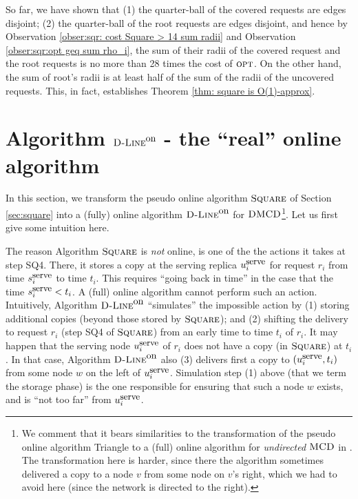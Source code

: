 \documentclass[11pt]{article}
\newcommand{\MCD}{\mbox{\sc MCD}}
\newcommand{\DMCD}{\mbox{\sc DMCD}}
\newcommand{\opt}{\mbox{\textsc{opt}}}
\newcommand{\Square}[0]{\mbox{\sc Square}}
\newcommand{\rep}[2]{(#1,#2)}
\newcommand{\Dlineon}[0]{\mbox{{\sc D-Line}}^{\mbox{\upshape on}}}
\newcommand{\uSQ}{u^{\mbox{\small\upshape serve}}}
\newcommand{\sSQ}{s^{\mbox{\small\upshape serve}}}
\begin{document}
So far, we have shown that
(1) the quarter-ball of the covered requests are edges disjoint;
(2) the quarter-ball of the root requests are edges disjoint, and hence by Observation \ref{obser:sqr: cost Square > 14 sum radii} and Observation \ref{obser:sqr:opt geq sum rho_i}, the sum of their radii of the covered request and the root requests is no more than 28 times the cost of $\opt$.
On the other hand,
the sum of root's radii is at least half of the sum of the radii of the uncovered requests.
This, in fact, establishes Theorem \ref{thm: square is O(1)-approx}.


\AppSquareThm






\section{Algorithm $\Dlineon$ - the ``real'' online algorithm}
\label{subsec: Algorithm Donline}








In this section, we transform the pseudo online algorithm $\Square$ of Section \ref{sec:square} into a (fully) online algorithm $\Dlineon$  for $\DMCD$\footnote{
We comment that it bears similarities to the transformation of the pseudo online algorithm Triangle to a (full) online algorithm for {\em undirected} $\MCD$ in \cite{KK2014}. The transformation here is harder, since there the algorithm sometimes delivered a copy to a node $v$ from some node on $v$'s right, which we had to avoid here (since the network is directed to the right).
}.
Let us first give some intuition here.

The reason Algorithm $\Square$ is {\em not} online, is one of the the actions it takes at step SQ4.
There, it stores a copy at the serving replica  $\uSQ_i$ for request $r_i$ from time $\sSQ_i$ to time $t_i$.
This requires ``going back in time'' in the case that the time ${\sSQ_i}< t_i$.
A (full) online algorithm cannot perform such an action.
Intuitively, Algorithm $\Dlineon$ ``simulates'' the impossible action by
(1) storing additional copies (beyond those stored by $\Square$); and
(2) shifting the delivery to request $r_i$ (step SQ4 of $\Square$) from an early time to time $t_i$ of $r_i$.
It may happen that the serving node $\uSQ_i$ of $r_i$ does not have a copy (in $\Square$) at $t_i$.
In that case, Algorithm $\Dlineon$ also (3)
delivers first a copy to $\rep{\uSQ_i}{t_i}$ from some node $w$ on the left of $\uSQ_i$.
Simulation step (1) above (that we term the storage phase) is the one responsible for ensuring that such a node $w$ exists, and is ``not too far'' from $\uSQ_i$.
\end{document}
